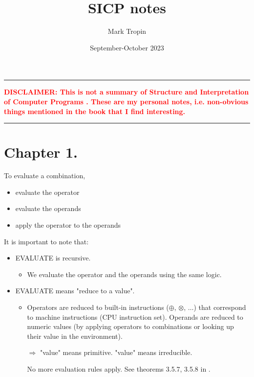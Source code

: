 \documentclass{article}
\title{SICP notes}
\author{Mark Tropin}
\date{September-October 2023}
\begin{document}
\large

\maketitle

\noindent
{\color{red} \rule{\linewidth}{0.5mm}}

\textcolor{red}{\textbf{DISCLAIMER: This is not a summary of Structure and Interpretation of Computer Programs \cite{sicp}. These are my personal notes, 
i.e. non-obvious things mentioned in the book that I find interesting.}}

\noindent
{\color{red} \rule{\linewidth}{0.5mm}}

\section*{Chapter 1.}

To evaluate a combination,
\begin{itemize}
    \item evaluate the operator
    \item evaluate the operands
    \item apply the operator to the operands
\end{itemize}

\noindent
It is important to note that:
\begin{itemize}
    \item EVALUATE is recursive.
    \begin{itemize}
        \item We evaluate the operator and the operands using the same logic.
    \end{itemize}
    \item EVALUATE means "reduce to a value".
    \begin{itemize}
        \item Operators are reduced to built-in instructions ($\oplus$, $\otimes$, $\dots$)
	that correspond to machine instructions (CPU instruction set).
	Operands are reduced to numeric values
	(by applying operators to combinations or
	looking up their value in the environment).
 
	$\Longrightarrow$ "value" means primitive. "value" means irreducible.
 
		No more evaluation rules apply. See theorems 3.5.7, 3.5.8 in \cite{tapl}.
 
    \end{itemize}
\end{itemize}
\end{document}
